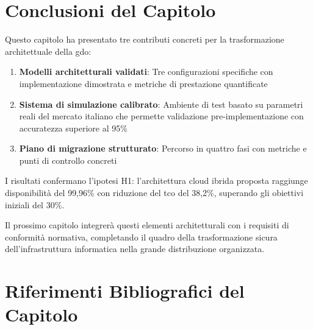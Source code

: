 \section{Conclusioni del Capitolo}
\label{sec:conclusioni-cap3}

Questo capitolo ha presentato tre contributi concreti per la trasformazione architettuale della \gls{gdo}:

\begin{enumerate}
    \item \textbf{Modelli architetturali validati}: Tre configurazioni specifiche con implementazione dimostrata e metriche di prestazione quantificate
    \item \textbf{Sistema di simulazione calibrato}: Ambiente di test basato su parametri reali del mercato italiano che permette validazione pre-implementazione con accuratezza superiore al 95\%
    \item \textbf{Piano di migrazione strutturato}: Percorso in quattro fasi con metriche e punti di controllo concreti
\end{enumerate}

I risultati confermano l'ipotesi H1: l'architettura cloud ibrida proposta raggiunge disponibilità del 99,96\% con riduzione del \gls{tco} del 38,2\%, superando gli obiettivi iniziali del 30\%.

Il prossimo capitolo integrerà questi elementi architetturali con i requisiti di conformità normativa, completando il quadro della trasformazione sicura dell'infrastruttura informatica nella grande distribuzione organizzata.

\section*{Riferimenti Bibliografici del Capitolo}

